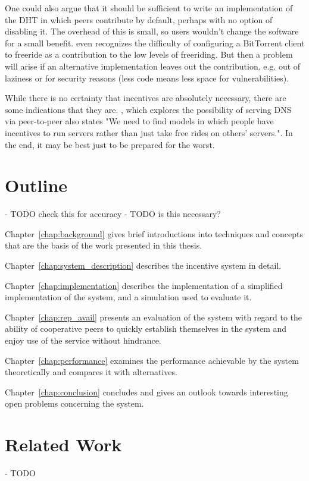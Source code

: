 One could also argue that it should be sufficient to write an implementation of
the \ac{DHT} in which peers contribute by default, perhaps with no option of
disabling it. The overhead of this is small, so users wouldn't change the
software for a small benefit. \cite{ripeanu2006gifting} even recognizes the
difficulty of configuring a BitTorrent client to freeride as a contribution to
the low levels of freeriding. But then a problem will arise if an alternative
implementation leaves out the contribution, e.g. out of laziness or for security
reasons (less code means less space for vulnerabilities).

While there is no certainty that incentives are absolutely necessary, there are
some indications that they are. \cite{cox2002serving}, which explores the
possibility of serving DNS via peer-to-peer also states "We need to find models
in which people have incentives to run servers rather than just take free rides
on others’ servers.". In the end, it may be best just to be prepared for the
worst.

\section{Outline}
- TODO check this for accuracy
- TODO is this necessary?

Chapter~\ref{chap:background} gives brief introductions into techniques and
concepts that are the basis of the work presented in this thesis.

Chapter~\ref{chap:system_description} describes the incentive system in detail.

Chapter~\ref{chap:implementation} describes the implementation of a simplified
implementation of the system, and a simulation used to evaluate it.

Chapter~\ref{chap:rep_avail} presents an evaluation of the system with regard to
the ability of cooperative peers to quickly establish themselves in the system
and enjoy use of the service without hindrance.

Chapter~\ref{chap:performance} examines the performance achievable by the system
theoretically and compares it with alternatives.

Chapter~\ref{chap:conclusion} concludes and gives an outlook towards interesting
open problems concerning the system.

\section{Related Work}
- TODO

